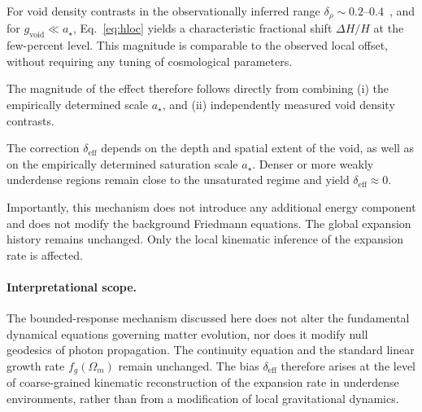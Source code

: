   For void density contrasts in the observationally inferred range
  $\delta_\rho \sim 0.2$--$0.4$~\cite{Keenan2013KBC},
  and for $g_{\mathrm{void}} \ll a_\star$,
  Eq.~\eqref{eq:hloc} yields a characteristic fractional shift
  $\Delta H/H$ at the few-percent level.
  This magnitude is comparable to the observed local offset,
  without requiring any tuning of cosmological parameters.

  The magnitude of the effect therefore follows directly from combining
  (i) the empirically determined scale $a_\star$,
  and
  (ii) independently measured void density contrasts.

  The correction $\delta_{\mathrm{eff}}$ depends on the depth and spatial extent
  of the void, as well as on the empirically determined saturation scale
  $a_\star$.
  Denser or more weakly underdense regions remain close to the unsaturated regime
  and yield $\delta_{\mathrm{eff}} \approx 0$.

  Importantly, this mechanism does not introduce any additional energy component
  and does not modify the background Friedmann equations.
  The global expansion history remains unchanged.
  Only the local kinematic inference of the expansion rate is affected.

  \paragraph*{Interpretational scope.}
    The bounded-response mechanism discussed here does not alter the
    fundamental dynamical equations governing matter evolution,
    nor does it modify null geodesics of photon propagation.
    The continuity equation and the standard linear growth rate
    $f_g(\Omega_m)$ remain unchanged.
    The bias $\delta_{\mathrm{eff}}$ therefore arises at the level of
    coarse-grained kinematic reconstruction of the expansion rate in
    underdense environments, rather than from a modification of local
    gravitational dynamics.


